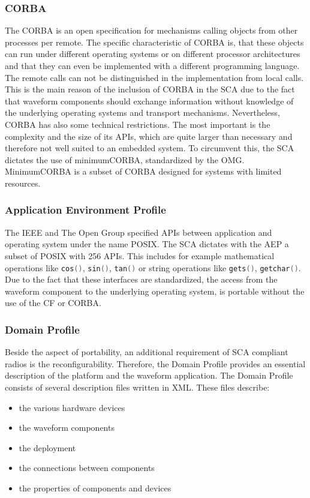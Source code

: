 \subsubsection{CORBA}

The \ac{CORBA} is an open specification for mechanisms calling objects from other processes per remote. The specific characteristic of \ac{CORBA} is, that these objects can run under different operating systems or on different processor architectures and that they can even be implemented with a different programming language. The remote calls can not be distinguished in the implementation from local calls. This is the main reason of the inclusion of \ac{CORBA} in the \ac{SCA} due to the fact that waveform components should exchange information without knowledge of the underlying operating systems and transport mechanisms. Nevertheless, \ac{CORBA} has also some technical restrictions. The most important is the complexity and the size of its \acp{API}, which are quite larger than necessary \cite{rise_fall_corba} and therefore not well suited to an embedded system. To circumvent this, the \ac{SCA} dictates the use of minimumCORBA, standardized by the \acl{OMG}. MinimumCORBA is a subset of \ac{CORBA} designed for systems with limited resources.

\subsubsection{Application Environment Profile}

The \ac{IEEE} and The Open Group specified \acp{API} between application and operating system under the name \ac{POSIX}. The \ac{SCA} \cite{SCA222} dictates with the \ac{AEP} a subset of \ac{POSIX} with 256 \acp{API}. This includes for example mathematical operations like \lstinline[language=C]!cos()!, \lstinline[language=C]!sin()!, \lstinline[language=C]!tan()! or string operations like \lstinline[language=C]!gets()!, \lstinline[language=C]!getchar()!. Due to the fact that these interfaces are standardized, the access from the waveform component to the underlying operating system, is portable without the use of the \ac{CF} or \ac{CORBA}.


\subsubsection{Domain Profile}

Beside the aspect of portability, an additional requirement of SCA compliant radios is the reconfigurability. Therefore, the Domain Profile provides an essential description of the platform and the waveform application. The Domain Profile consists of several description files written in \ac{XML}. These files describe:
\begin{itemize}
	\item the various hardware devices
	\item the waveform components
	\item the deployment
	\item the connections between components
	\item the properties of components and devices 
\end{itemize}

